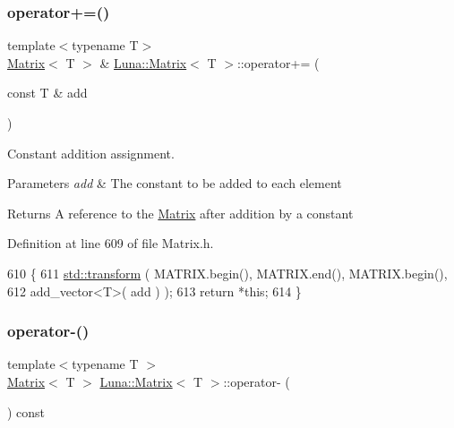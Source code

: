 \subsubsection{\texorpdfstring{operator+=()}{operator+=()}\hspace{0.1cm}{\footnotesize\ttfamily [2/2]}}
{\footnotesize\ttfamily template$<$typename T$>$ \\
\hyperlink{classLuna_1_1Matrix}{Matrix}$<$ T $>$ \& \hyperlink{classLuna_1_1Matrix}{Luna\+::\+Matrix}$<$ T $>$\+::operator+= (\begin{DoxyParamCaption}\item[{const T \&}]{add }\end{DoxyParamCaption})\hspace{0.3cm}{\ttfamily [inline]}}



Constant addition assignment. 


\begin{DoxyParams}{Parameters}
{\em add} & The constant to be added to each element \\
\hline
\end{DoxyParams}
\begin{DoxyReturn}{Returns}
A reference to the \hyperlink{classLuna_1_1Matrix}{Matrix} after addition by a constant 
\end{DoxyReturn}


Definition at line 609 of file Matrix.\+h.


\begin{DoxyCode}
610   \{
611     \hyperlink{namespaceHeat__plot_aeaa6785bedcad63b4bd40e8cb1bad8a0}{std::transform} ( MATRIX.begin(), MATRIX.end(),  MATRIX.begin(),
612                      add\_vector<T>( add ) );
613     \textcolor{keywordflow}{return} *\textcolor{keyword}{this};
614   \}
\end{DoxyCode}
\mbox{\label{classLuna_1_1Matrix_a9308b5c350baf8544a0fc53533e734c8}} 
\subsubsection{\texorpdfstring{operator-\/()}{operator-()}\hspace{0.1cm}{\footnotesize\ttfamily [1/2]}}
{\footnotesize\ttfamily template$<$typename T $>$ \\
\hyperlink{classLuna_1_1Matrix}{Matrix}$<$ T $>$ \hyperlink{classLuna_1_1Matrix}{Luna\+::\+Matrix}$<$ T $>$\+::operator-\/ (\begin{DoxyParamCaption}{ }\end{DoxyParamCaption}) const\hspace{0.3cm}{\ttfamily [inline]}}



